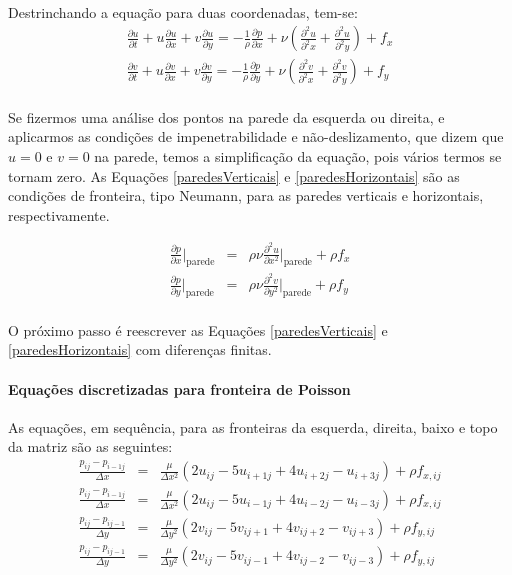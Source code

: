 \documentclass[poisson.tex]{subfiles}
\begin{document}
\paragraph{} Destrinchando a equação para duas coordenadas, tem-se:
\begin{eqnarray}
\frac{\partial u}{\partial t}+u\frac{\partial u}{\partial x}+v\frac{\partial
u}{\partial y}=-\frac{1}{\rho}\frac{\partial p}{\partial
x}+\nu\left(\frac{\partial^2 u}{\partial^2 x}+\frac{\partial^2 u}{\partial^2
y}\right)+f_x\\
\frac{\partial v}{\partial t}+u\frac{\partial v}{\partial x}+v\frac{\partial
v}{\partial y}=-\frac{1}{\rho}\frac{\partial p}{\partial
y}+\nu\left(\frac{\partial^2 v}{\partial^2 x}+\frac{\partial^2 v}{\partial^2
y}\right)+f_y
\end{eqnarray}
\paragraph{} Se fizermos uma análise dos pontos na parede da esquerda ou
direita, e aplicarmos as condições de impenetrabilidade e não-deslizamento, que
dizem que $u=0$ e $v=0$ na parede, temos a simplificação da equação, pois vários
termos se tornam zero. As Equações \ref{paredesVerticais} e \ref{paredesHorizontais} são as condições de fronteira, tipo Neumann, para as paredes verticais e horizontais, respectivamente.

\begin{eqnarray}
\frac{\partial p}{\partial x}\Bigg|_{\textrm{parede}}&=&\rho\nu\frac{\partial^2
u}{\partial x^2}\Bigg|_{\textrm{parede}}+\rho f_x\label{paredesVerticais}\\
\frac{\partial p}{\partial y}\Bigg|_{\textrm{parede}}&=&\rho\nu\frac{\partial^2
v}{\partial y^2}\Bigg|_{\textrm{parede}}+\rho f_y\label{paredesHorizontais}
\end{eqnarray}
\paragraph{} O próximo passo é reescrever as Equações \ref{paredesVerticais}  e \ref{paredesHorizontais} com diferenças finitas. 
\paragraph{Equações discretizadas para fronteira de Poisson} As equações, em
sequência, para as fronteiras da esquerda, direita, baixo e topo da matriz são
as seguintes:
\begin{eqnarray}
\frac{p_{ij}-p_{i-1j}}{\Delta x}&=&\frac{\mu}{\Delta x^2}(2u_{ij}-5u_{i+1j}+4u_{i+2j}-u_{i+3j})+\rho f_{x,ij} \label{pressure_01}\\
\frac{p_{ij}-p_{i-1j}}{\Delta x}&=&\frac{\mu}{\Delta x^2}(2u_{ij}-5u_{i-1j}+4u_{i-2j}-u_{i-3j})+\rho f_{x,ij}\label{pressure_02}\\
\frac{p_{ij}-p_{ij-1}}{\Delta y}&=&\frac{\mu}{\Delta y^2}(2v_{ij}-5v_{ij+1}+4v_{ij+2}-v_{ij+3})+\rho f_{y,ij} \label{pressure_03}\\
\frac{p_{ij}-p_{ij-1}}{\Delta y}&=&\frac{\mu}{\Delta y^2}(2v_{ij}-5v_{ij-1}+4v_{ij-2}-v_{ij-3})+\rho f_{y,ij} \label{pressure_04}
\end{eqnarray}
\end{document}
